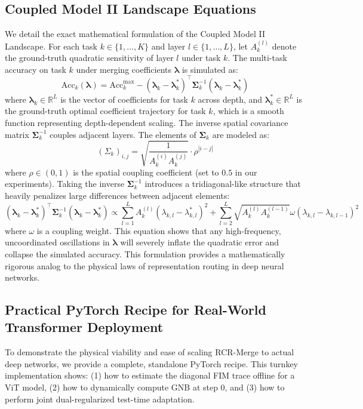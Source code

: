 \documentclass{article}
\theoremstyle{plain}
\theoremstyle{definition}
\theoremstyle{remark}
\begin{document}
\subsection{Coupled Model II Landscape Equations}
We detail the exact mathematical formulation of the Coupled Model II Landscape. For each task $k \in \{1, \dots, K\}$ and layer $l \in \{1, \dots, L\}$, let $A_k^{(l)}$ denote the ground-truth quadratic sensitivity of layer $l$ under task $k$.
The multi-task accuracy on task $k$ under merging coefficients $\boldsymbol{\lambda}$ is simulated as:
\begin{equation}
\text{Acc}_k(\boldsymbol{\lambda}) = \text{Acc}_k^{\text{max}} - (\boldsymbol{\lambda}_k - \boldsymbol{\lambda}_k^*)^{\top} \boldsymbol{\Sigma}_k^{-1} (\boldsymbol{\lambda}_k - \boldsymbol{\lambda}_k^*)
\end{equation}
where $\boldsymbol{\lambda}_k \in \mathbb{R}^L$ is the vector of coefficients for task $k$ across depth, and $\boldsymbol{\lambda}_k^* \in \mathbb{R}^L$ is the ground-truth optimal coefficient trajectory for task $k$, which is a smooth function representing depth-dependent scaling.
The inverse spatial covariance matrix $\boldsymbol{\Sigma}_k^{-1}$ couples adjacent layers. The elements of $\boldsymbol{\Sigma}_k$ are modeled as:
\begin{equation}
(\Sigma_k)_{i, j} = \sqrt{\frac{1}{A_k^{(i)} A_k^{(j)}}} \cdot \rho^{|i-j|}
\end{equation}
where $\rho \in (0, 1)$ is the spatial coupling coefficient (set to $0.5$ in our experiments). 
Taking the inverse $\boldsymbol{\Sigma}_k^{-1}$ introduces a tridiagonal-like structure that heavily penalizes large differences between adjacent elements:
\begin{equation}
(\boldsymbol{\lambda}_k - \boldsymbol{\lambda}_k^*)^{\top} \boldsymbol{\Sigma}_k^{-1} (\boldsymbol{\lambda}_k - \boldsymbol{\lambda}_k^*) \propto \sum_{l=1}^L A_k^{(l)} (\lambda_{k, l} - \lambda_{k, l}^*)^2 + \sum_{l=2}^L \sqrt{A_k^{(l)} A_k^{(l-1)}} \omega (\lambda_{k, l} - \lambda_{k, l-1})^2
\end{equation}
where $\omega$ is a coupling weight. This equation shows that any high-frequency, uncoordinated oscillations in $\boldsymbol{\lambda}$ will severely inflate the quadratic error and collapse the simulated accuracy. This formulation provides a mathematically rigorous analog to the physical laws of representation routing in deep neural networks.

\subsection{Practical PyTorch Recipe for Real-World Transformer Deployment}
To demonstrate the physical viability and ease of scaling RCR-Merge to actual deep networks, we provide a complete, standalone PyTorch recipe. This turnkey implementation shows: (1) how to estimate the diagonal FIM trace offline for a ViT model, (2) how to dynamically compute GNB at step 0, and (3) how to perform joint dual-regularized test-time adaptation.
\end{document}
